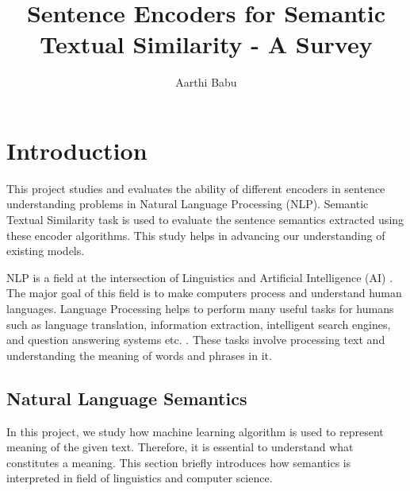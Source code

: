 \documentclass[12pt]{report} %
\title{Sentence Encoders for Semantic Textual Similarity - A Survey}
\author{Aarthi Babu}
\begin{document}
\maketitle
\tableofcontents
\newpage



\chapter{Introduction}


	This project studies and evaluates the ability of different encoders in sentence understanding problems in Natural Language Processing (NLP). Semantic Textual Similarity task is used to evaluate the sentence semantics extracted using these encoder algorithms. This study helps in advancing our understanding of existing models.
	
	NLP is a field at the intersection of Linguistics and Artificial Intelligence (AI) \citep{jurafsky2014speech}. The major goal of this field is to make computers process and understand human languages. Language Processing helps to perform many useful tasks for humans such as language translation, information extraction, intelligent search engines, and question answering systems etc. \citep{jurafsky2014speech}. These tasks involve processing text and understanding the meaning of words and phrases in it. 
	
	\section{Natural Language Semantics}
	In this project, we study how machine learning algorithm is used to represent meaning of the given text. Therefore, it is essential to understand what constitutes a meaning. This section briefly introduces how semantics is interpreted in field of linguistics and computer science. 
	
\end{document}
